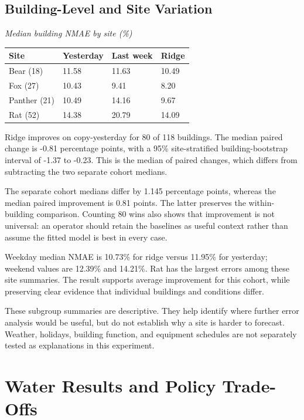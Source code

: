 \documentclass[12pt,a4paper]{article}
\begin{document}
\subsection{Building-Level and Site Variation}
\begin{center}\small
\textit{Median building NMAE by site (\%)}\par\medskip
\begin{tabularx}{\textwidth}{XXXX}
\toprule
\textbf{Site} & \textbf{Yesterday} & \textbf{Last week} & \textbf{Ridge}\\\midrule
Bear (18) & 11.58 & 11.63 & 10.49\\
Fox (27) & 10.43 & 9.41 & 8.20\\
Panther (21) & 10.49 & 14.16 & 9.67\\
Rat (52) & 14.38 & 20.79 & 14.09\\
\bottomrule\end{tabularx}\end{center}
Ridge improves on copy-yesterday for 80 of 118 buildings. The median paired change is -0.81 percentage points, with a 95\% site-stratified building-bootstrap interval of -1.37 to -0.23. This is the median of paired changes, which differs from subtracting the two separate cohort medians.

The separate cohort medians differ by 1.145 percentage points, whereas the median paired improvement is 0.81 points. The latter preserves the within-building comparison. Counting 80 wins also shows that improvement is not universal: an operator should retain the baselines as useful context rather than assume the fitted model is best in every case.

Weekday median NMAE is 10.73\% for ridge versus 11.95\% for yesterday; weekend values are 12.39\% and 14.21\%. Rat has the largest errors among these site summaries. The result supports average improvement for this cohort, while preserving clear evidence that individual buildings and conditions differ.

These subgroup summaries are descriptive. They help identify where further error analysis would be useful, but do not establish why a site is harder to forecast. Weather, holidays, building function, and equipment schedules are not separately tested as explanations in this experiment.

\newpage
\section{Water Results and Policy Trade-Offs}
\end{document}
